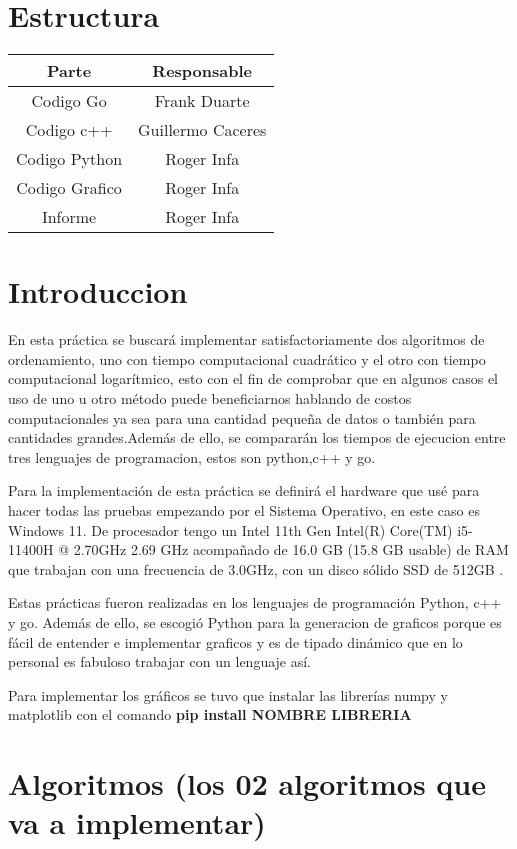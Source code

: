 \section{Estructura}

\begin{tabular}{| c | c |}
    \hline
    Parte & Responsable \\ \hline
    Codigo Go & Frank Duarte \\ 
    Codigo c++ & Guillermo Caceres \\ 
    Codigo Python & Roger Infa \\ 
    Codigo Grafico & Roger Infa \\
    Informe & Roger Infa \\ \hline
\end{tabular}

\section{Introduccion}

En esta práctica se buscará  implementar satisfactoriamente dos algoritmos de ordenamiento, uno con tiempo computacional cuadrático y el otro con tiempo computacional logarítmico, esto con el fin de comprobar que  en algunos casos el uso de uno u otro método puede beneficiarnos hablando de costos computacionales ya sea para una cantidad  pequeña de datos o también para cantidades grandes.Además de ello, se compararán los tiempos de ejecucion entre tres lenguajes de programacion, estos son python,c++ y go.

Para la implementación de esta práctica se definirá el hardware  que usé para hacer todas las pruebas empezando por el Sistema Operativo, en este caso es  Windows 11. De procesador tengo un Intel 11th Gen Intel(R) Core(TM) i5-11400H @ 2.70GHz   2.69 GHz acompañado de 16.0 GB (15.8 GB usable) de RAM que trabajan con una frecuencia de  3.0GHz, con un disco sólido SSD de 512GB .

Estas prácticas fueron realizadas en los lenguajes de programación Python, c++ y go. Además de ello, se escogió Python para la generacion de graficos porque es fácil de entender e implementar graficos y es de tipado dinámico que en lo personal es fabuloso trabajar con un lenguaje así.

Para implementar los gráficos se tuvo que  instalar las librerías numpy y matplotlib con el comando \textbf{pip install  NOMBRE LIBRERIA }


\section{Algoritmos (los 02 algoritmos que va a implementar)}

